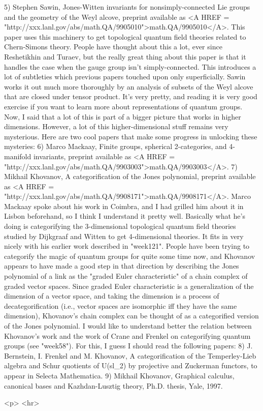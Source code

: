 5) Stephen Sawin, Jones-Witten invariants for nonsimply-connected
Lie groups and the geometry of the Weyl alcove, preprint available
as <A HREF = "http://xxx.lanl.gov/abs/math.QA/9905010">math.QA/9905010</A>.
This paper uses this machinery to get topological quantum field
theories related to Chern-Simons theory.   People have thought about 
this a lot, ever since Reshetikhin and Turaev, but the really
great thing about this paper is that it handles the case when
the gauge group isn't simply-connected.  This introduces a lot
of subtleties which previous papers touched upon only superficially.
Sawin works it out much more thoroughly by an analysis of subsets
of the Weyl alcove that are closed under tensor product.  It's
very pretty, and reading it is very good exercise if you want to
learn more about representations of quantum groups.
Now, I said that a lot of this is part of a bigger picture that
works in higher dimensions.  However, a lot of this higher-dimensional
stuff remains very mysterious.  Here are two cool papers that make
some progress in unlocking these mysteries:
6) Marco Mackaay, Finite groups, spherical 2-categories, and 4-manifold
invariants, preprint available as 
<A HREF = "http://xxx.lanl.gov/abs/math.QA/9903003">math.QA/9903003</A>.
7) Mikhail Khovanov, A categorification of the Jones polynomial, 
preprint available as <A HREF = "http://xxx.lanl.gov/abs/math.QA/9908171">math.QA/9908171</A>.
Marco Mackaay spoke about his work in Coimbra, and I had grilled
him about it in Lisbon beforehand, so I think I understand it 
pretty well.  Basically what he's doing is categorifying the 
3-dimensional topological quantum field theories studied by Dijkgraaf 
and Witten to get 4-dimensional theories.  It fits in very nicely 
with his earlier work described in "week121".  
People have been trying to categorify the magic of quantum groups
for quite some time now, and Khovanov appears to have made a good
step in that direction by describing the Jones polynomial of a
link as the "graded Euler characteristic" of a chain complex of
graded vector spaces.  Since graded Euler characteristic is a
generalization of the dimension of a vector space, and taking the
dimension is a process of decategorification (i.e., vector spaces
are isomorphic iff they have the same dimension), Khovanov's 
chain complex can be thought of as a categorified version of the
Jones polynomial.  
I would like to understand better the relation between Khovanov's
work and the work of Crane and Frenkel on categorifying quantum
groups (see "week58").  For this, I guess I should read the 
following papers:
8) J. Bernstein, I. Frenkel and M. Khovanov, A categorification
of the Temperley-Lieb algebra and Schur quotients of U(sl_2)
by projective and Zuckerman functors, to appear in Selecta
Mathematica.
9) Mikhail Khovanov, Graphical calculus, canonical bases and
Kazhdan-Lusztig theory, Ph.D. thesis, Yale, 1997.

<p> <hr>



